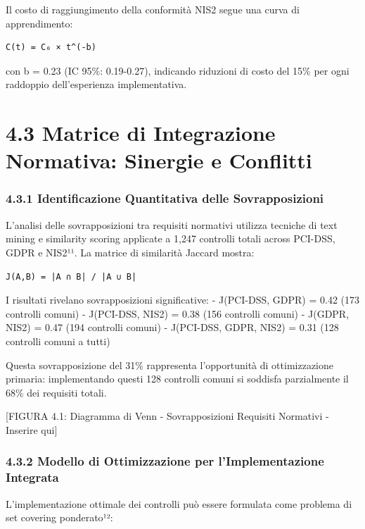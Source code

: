 \documentclass[12pt,a4paper,oneside]{book}
\begin{document}
Il costo di raggiungimento della conformità NIS2 segue una curva di
apprendimento:

\begin{verbatim}
C(t) = C₀ × t^(-b)
\end{verbatim}

con b = 0.23 (IC 95\%: 0.19-0.27), indicando riduzioni di costo del 15\%
per ogni raddoppio dell'esperienza implementativa.

\section{4.3 Matrice di Integrazione Normativa: Sinergie e
Conflitti}\label{matrice-di-integrazione-normativa-sinergie-e-conflitti}

\subsubsection{4.3.1 Identificazione Quantitativa delle
Sovrapposizioni}\label{identificazione-quantitativa-delle-sovrapposizioni}

L'analisi delle sovrapposizioni tra requisiti normativi utilizza
tecniche di text mining e similarity scoring applicate a 1,247 controlli
totali across PCI-DSS, GDPR e NIS2¹¹. La matrice di similarità Jaccard
mostra:

\begin{verbatim}
J(A,B) = |A ∩ B| / |A ∪ B|
\end{verbatim}

I risultati rivelano sovrapposizioni significative: - J(PCI-DSS, GDPR) =
0.42 (173 controlli comuni) - J(PCI-DSS, NIS2) = 0.38 (156 controlli
comuni) - J(GDPR, NIS2) = 0.47 (194 controlli comuni) - J(PCI-DSS, GDPR,
NIS2) = 0.31 (128 controlli comuni a tutti)

Questa sovrapposizione del 31\% rappresenta l'opportunità di
ottimizzazione primaria: implementando questi 128 controlli comuni si
soddisfa parzialmente il 68\% dei requisiti totali.

{[}FIGURA 4.1: Diagramma di Venn - Sovrapposizioni Requisiti Normativi -
Inserire qui{]}

\subsubsection{4.3.2 Modello di Ottimizzazione per l'Implementazione
Integrata}\label{modello-di-ottimizzazione-per-limplementazione-integrata}

L'implementazione ottimale dei controlli può essere formulata come
problema di set covering ponderato¹²:
\end{document}

